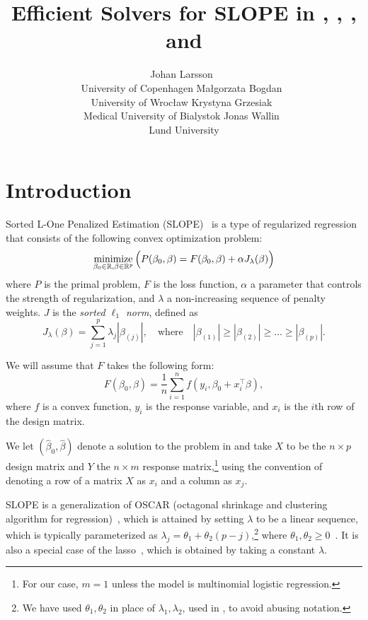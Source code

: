 \documentclass[article]{jss}
\author{
  Johan Larsson~\orcidlink{0000-0002-4029-5945}\\University of Copenhagen
  \And
  Ma\l{}gorzata Bogdan~\orcidlink{0000-0001-6355-8261}\\University of Wroc\l{}aw
  \AND
  Krystyna Grzesiak~\orcidlink{0000-0003-2581-7722}\\Medical University of Bialystok
  \And
  Jonas Wallin~\orcidlink{0000-0003-0381-6593}\\Lund University
}
\title{Efficient Solvers for SLOPE in \proglang{R}, \proglang{Python}, \proglang{Julia}, and \proglang{C++}}
\let\Cref\crtCref
\begin{document}
\section{Introduction}

Sorted L-One Penalized Estimation
(SLOPE)~\citep{bogdan2013,zeng2014,bogdan2015} is a type of
regularized regression that consists of the following convex optimization problem:
\begin{equation}
  \label{eq:slope}
  \operatorname*{minimize}_{\beta_0 \in \mathbb{R},\beta \in \mathbb{R}^p}
  \Big(
  P(\beta_0,\beta)
  = F(\beta_0, \beta) + \alpha J_{\lambda}(\beta)
  \Big)
\end{equation}
where \(P\) is the primal problem, \(F\) is the loss function, \(\alpha\) a parameter
that controls the strength of regularization, and \(\lambda\) a non-increasing sequence of penalty weights. \(J\) is the
\emph{sorted $\ell_1$ norm}, defined as
\begin{equation}
  \label{eq:sl1}
  J_{\lambda}(\beta) = \sum_{j=1}^p \lambda_j |\beta_{(j)}|, \quad
  \text{where}\quad |\beta_{(1)}| \geq |\beta_{(2)}| \geq \ldots \geq
  |\beta_{(p)}|.
\end{equation}

We will assume that \(F\) takes the following form:
\[
  F(\beta_0, \beta) = \frac{1}{n} \sum_{i=1}^n f(y_i, \beta_0 + x_i^\intercal \beta),
\]
where \(f\) is a convex function, \(y_i\) is the response variable, and
\(x_i\) is the \(i\)th row of the design matrix.

We let \((\hat{\beta}_0, \hat{\beta})\) denote a solution to the problem in \Cref{eq:slope}
and take \(X\) to be the \(n \times p\) design matrix and \(Y\) the
\(n \times m\) response matrix,\footnote{For our case, \(m = 1\) unless
  the model is multinomial logistic regression.} using the convention
of denoting a row of a matrix \(X\) as \(x_i\) and a column as \(x_j\).

SLOPE is a generalization of OSCAR (octagonal shrinkage and clustering
algorithm for regression)~\citep{bondell2008}, which is attained by
setting \(\lambda\) to be a linear sequence, which is typically parameterized as
\(\lambda_j = \theta_1 + \theta_2(p - j)\),\footnote{We have used \(\theta_1,\theta_2\) in place of
  \(\lambda_1,\lambda_2\), used in \citet{bondell2008}, to avoid abusing notation.} where \(\theta_1, \theta_2
\geq 0\)~\citep{figueiredo2014}. It is also a special case of
the lasso~\citep{santosa1986,donoho1994,donoho1995,tibshirani1996},
which is obtained by taking a constant \(\lambda\).
\end{document}
